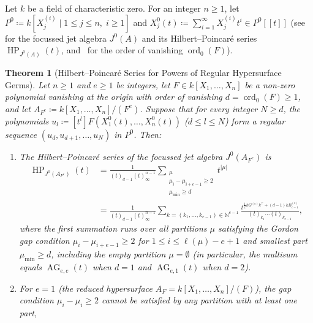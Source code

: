 \documentclass[a4paper, 12pt, reqno]{amsart}
\newtheorem{theorem}{Theorem}[section]
\theoremstyle{remark}
\begin{document}
Let $k$ be a field of characteristic zero.
For an integer $n \ge 1$,
let $P^0 \coloneq k[X_j^{(i)} \mid 1 \le j \le n,\; i \ge 1]$ and $X^0_j(t) \coloneq \sum_{i = 1}^\infty X_j^{(i)} t^i \in P^0[[t]]$
(see~ for the focussed jet algebra $J^0(A)$ and its Hilbert--Poincaré series $\operatorname{HP}_{J^0(A)}(t)$,
and~ for the order of vanishing $\operatorname{ord}_0(F)$).

\begin{theorem}[Hilbert--Poincaré Series for Powers of Regular Hypersurface Germs]
  \label{thm:general-regular-germs}
  Let $n \ge 1$ and $e \ge 1$ be integers,
  let $F \in k[X_1, \dots, X_n]$ be a non-zero polynomial vanishing at the origin with order of vanishing $d = \operatorname{ord}_0(F) \ge 1$,
  and let $A_{F^e} \coloneq k[X_1, \dots, X_n] / (F^e)$.
  Suppose that for every integer $N \ge d$,
  the polynomials $u_l \coloneq [t^l]F(X^0_1(t), \dots, X^0_n(t))$ ($d \le l \le N$) form a regular sequence $(u_d, u_{d + 1}, \dots, u_N)$ in $P^0$.
  Then:
  \begin{enumerate}
  \item The Hilbert--Poincaré series of the focussed jet algebra $J^0(A_{F^e})$ is
    \begin{equation}
      \label{eq:HP-general-regular}
      \begin{aligned}
        \operatorname{HP}_{J^0(A_{F^e})}(t)
        &= \frac{1}{(t)_{d - 1}(t)_\infty^{n - 1}} \sum_{\substack{\mu \\ \mu_i - \mu_{i + e - 1} \ge 2 \\ \mu_{\mathrm{min}} \ge d}} t^{|\mu|} \\
        &= \frac{1}{(t)_{d - 1}(t)_\infty^{n - 1}} \sum_{k = (k_1, \dots, k_{e - 1}) \in \mathbb{N}^{e - 1}} \frac{t^{\frac{1}{2}kG^{(e)}k^\top + (d - 1)kB^{(e)}_{e - 1}}}{(t)_{k_1} \cdots (t)_{k_{e - 1}}},
      \end{aligned}
    \end{equation}
    where the first summation runs over all partitions $\mu$ satisfying the Gordon gap condition $\mu_i - \mu_{i + e - 1} \ge 2$ for $1 \le i \le \ell(\mu) - e + 1$ and smallest part $\mu_{\mathrm{min}} \ge d$,
    including the empty partition $\mu = \emptyset$
    (in particular, the multisum equals $\operatorname{AG}_{e, e}(t)$ when $d = 1$ and $\operatorname{AG}_{e, 1}(t)$ when $d = 2$).
  \item For $e = 1$ (the reduced hypersurface $A_F = k[X_1, \dots, X_n] / (F)$),
    the gap condition $\mu_i - \mu_i \ge 2$ cannot be satisfied by any partition with at least one part,

\end{enumerate}
\end{theorem}
\end{document}

